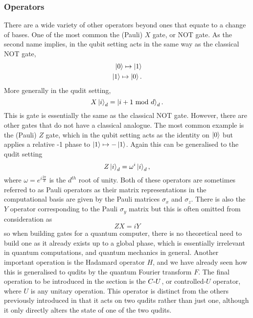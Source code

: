 \subsubsection{Operators}
\label{subsubsection:operators}
There are a wide variety of other operators beyond ones that equate to a change of bases.
One of the most common the (Pauli) $X$ gate, or NOT gate.
As the second name implies, in the qubit setting acts in the same way as the classical NOT gate,
\begin{align}
    \ket{0} \mapsto \ket{1}\\
    \ket{1} \mapsto \ket{0}.
\end{align}
More generally in the qudit setting,
\begin{equation}
    X\ket{i}_d = \ket{i + 1 \text{ mod } d}_d.
\end{equation}
This is gate is essentially the same as the classical NOT gate.
However, there are other gates that do not have a classical analogue.
The most common example is the (Pauli) $Z$ gate, which in the qubit setting acts as the identity on $\ket{0}$ but applies a relative -1 phase to $\ket{1} \mapsto -\ket{1}$.
Again this can be generalised to the qudit setting
\begin{equation}
    Z\ket{i}_d = \omega^i\ket{i}_d,
\end{equation}
where $\omega = e^{i\frac{2\pi}{d}}$ is the $d^{th}$ root of unity.
Both of these operators are sometimes referred to as Pauli operators as their matrix representations in the computational basis are given by the Pauli matrices $\sigma_x$ and $\sigma_z$.
There is also the $Y$ operator corresponding to the Pauli $\sigma_y$ matrix but this is often omitted from consideration as
\begin{equation}
    ZX = iY
\end{equation}
so when building gates for a quantum computer, there is no theoretical need to build one as it already exists up to a global phase, which is essentially irrelevant in quantum computations, and quantum mechanics in general.
Another important operation is the Hadamard operator $H$, and we have already seen how this is generalised to qudits by the quantum Fourier transform $F$.
The final operation to be introduced in the section is the $C\text{-}U$, or controlled-$U$ operator, where $U$ is any unitary operation.
This operator is distinct from the others previously introduced in that it acts on two qudits rather than just one, although it only directly alters the state of one of the two qudits.

